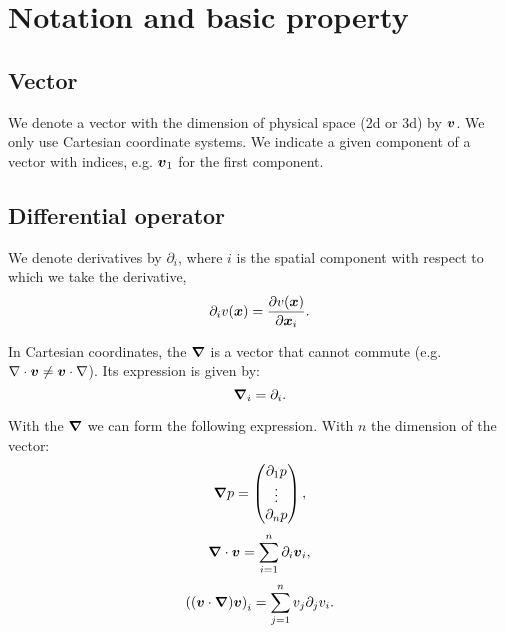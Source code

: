 \chapter{Notation and basic property}
\minitoc


\section{Vector}

We denote a vector with the dimension of physical space (2d or 3d) by ${\boldsymbol {v}}$.
We only use Cartesian coordinate systems.
We indicate a given component of a vector with indices, e.g. ${\boldsymbol {v}}_1$ for the first component.

\section{Differential operator}

We denote derivatives by  $\partial_i$, where $i$ is the spatial component with respect to which we take the derivative,
\begin{equation}
 \partial_i v({\boldsymbol {x}})=\frac{\partial v({\boldsymbol {x}})}{\partial {\boldsymbol {x}}_{i}}.
\end{equation}

\begin{definition}[Nabla]
 In Cartesian coordinates, the ${\boldsymbol {\nabla}}$ is a vector that cannot commute (e.g. $\nabla \cdot {\boldsymbol {v}}\neq {\boldsymbol {v}}\cdot \nabla$).
 Its expression is given by:
 \begin{equation}
 {\boldsymbol {\nabla}}_{i}=\partial_{i}.
 \end{equation}
\end{definition}

With the ${\boldsymbol {\nabla}}$ we can form the following expression.
With $n$ the dimension of the vector:
\begin{equation}
 {\boldsymbol {\nabla}}p=\begin{pmatrix}\partial_1 p\\ \vdots \\ \partial_n p\end{pmatrix},
\end{equation}
\begin{equation}
 {\boldsymbol {\nabla}}\cdot {\boldsymbol {v}}=\sum_{i=1}^{n}\partial_i {\boldsymbol {v}}_i,
\end{equation}
\begin{equation}
 \left(({\boldsymbol {v}}\cdot{\boldsymbol {\nabla}}){\boldsymbol {v}}\right)_{i}=\sum_{j=1}^{n}v_{j}\partial_{j} v_{i}.
\end{equation}


